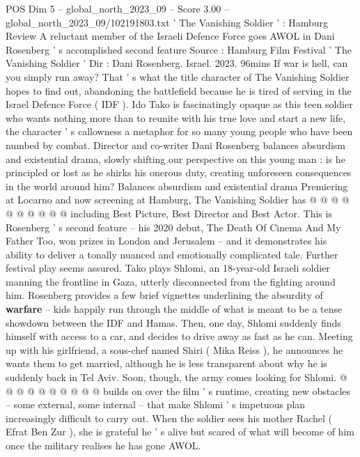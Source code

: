 \begin{textsample}{POS Dim 5 – global\_north\_2023\_09 – Score 3.00 – global\_north\_2023\_09/102191803.txt}  \label{ex:f5_pos_435}
' The Vanishing Soldier ' : Hamburg Review A reluctant member of the Israeli Defence Force goes AWOL in Dani Rosenberg ' s accomplished second feature Source : Hamburg Film Festival ' The Vanishing Soldier ' Dir : Dani Rosenberg.
Israel. 2023. 96mins If war is hell, can you simply run away?
That ' s what the title character of The Vanishing Soldier hopes to find out, abandoning the battlefield because he is tired of serving in the Israel Defence Force ( IDF ).
Ido Tako is fascinatingly opaque as this teen soldier who wants nothing more than to reunite with his true love and start a new life, the character ' s callowness a metaphor for so many young people who have been numbed by combat.
Director and co-writer Dani Rosenberg balances absurdism and existential drama, slowly shifting our perspective on this young man : is he principled or lost as he shirks his onerous duty, creating unforeseen consequences in the world around him?
Balances absurdism and existential drama Premiering at Locarno and now screening at Hamburg, The Vanishing Soldier has @ @ @ @ @ @ @ @ @ @ including Best Picture, Best Director and Best Actor.
This is Rosenberg ' s second feature -- his 2020 debut, The Death Of Cinema And My Father Too, won prizes in London and Jerusalem -- and it demonstrates his ability to deliver a tonally nuanced and emotionally complicated tale.
Further festival play seems assured.
Tako plays Shlomi, an 18-year-old Israeli soldier manning the frontline in Gaza, utterly disconnected from the fighting around him.
Rosenberg provides a few brief vignettes underlining the absurdity of \textbf{warfare} -- kids happily run through the middle of what is meant to be a tense showdown between the IDF and Hamas.
Then, one day, Shlomi suddenly finds himself with access to a car, and decides to drive away as fast as he can.
Meeting up with his girlfriend, a sous-chef named Shiri ( Mika Reiss ), he announces he wants them to get married, although he is less transparent about why he is suddenly back in Tel Aviv.
Soon, though, the army comes looking for Shlomi. @ @ @ @ @ @ @ @ @ @ builds on over the film ' s runtime, creating new obstacles -- some external, some internal -- that make Shlomi ' s impetuous plan increasingly difficult to carry out.
When the soldier sees his mother Rachel ( Efrat Ben Zur ), she is grateful he ' s alive but scared of what will become of him once the military realises he has gone AWOL.

\end{textsample}
